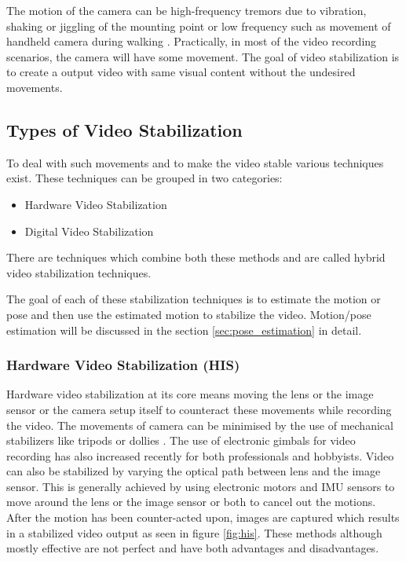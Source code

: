 The motion of the camera can be high-frequency tremors due to vibration, shaking or jiggling of the mounting point \citep{ryu2012robust} or low frequency such as movement of handheld camera during walking \citep{dis_review}. Practically, in most of the video recording scenarios, the camera will have some movement. The goal of video stabilization is to create a output video with same visual content without the undesired movements. 

\subsection{Types of Video Stabilization}
To deal with such movements and to make the video stable various techniques exist. These techniques can be grouped in two categories:

\begin{itemize}
\item Hardware Video Stabilization
\item Digital Video Stabilization  
\end{itemize}
There are techniques which combine both these methods and are called hybrid video stabilization techniques.

The goal of each of these stabilization techniques is to estimate the motion or pose and then use the estimated motion to stabilize the video. Motion/pose estimation will be discussed in the section \ref{sec:pose_estimation} in detail.


\subsubsection{Hardware Video Stabilization (HIS)}
Hardware video stabilization at its core means moving the lens or the image sensor or the camera setup itself to counteract these movements while recording the video. The movements of camera can be minimised by the use of mechanical stabilizers like tripods or dollies \citep{5995525}. The use of electronic gimbals for video recording has also increased recently for both professionals and hobbyists. Video can also be stabilized by varying the optical path between lens and the image sensor. This is generally achieved by using electronic motors and IMU sensors to move around the lens or the image sensor or both to cancel out the motions. After the motion has been counter-acted upon, images are captured which results in a stabilized video output as seen in figure \ref{fig:his}. These methods although mostly effective are not perfect and have both advantages and disadvantages.


